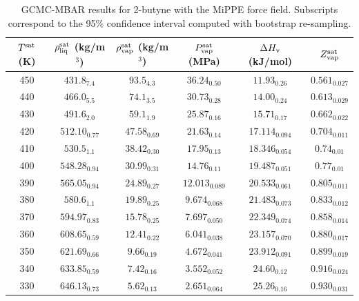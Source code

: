 \documentclass[journal=jctc,manuscript=article]{achemso}
\begin{document}
\begin{table}[htb!]
	\caption{GCMC-MBAR results for 2-butyne with the MiPPE force field. Subscripts correspond to the 95\% confidence interval computed with bootstrap re-sampling.}
	\begin{center}
		\begin{tabular}{|c|c|c|c|c|c|}
			\hline
			$T^{\rm sat}$ (K) & $\rho_{\rm liq}^{\rm sat}$ (kg/m$^3$) & $\rho_{\rm vap}^{\rm sat}$ (kg/m$^3$) & $P_{\rm vap}^{\rm sat}$ (MPa) & $\Delta H_{\rm v}$ (kJ/mol) & $Z_{\rm vap}^{\rm sat}$ \\ \hline
			450 & $431.8_{7.4}$ & $93.5_{4.3}$ & $36.24_{0.50}$ & $11.93_{0.26}$ & $0.561_{0.027}$ \\
			440 & $466.0_{5.5}$ & $74.1_{3.5}$ & $30.73_{0.28}$ & $14.00_{0.24}$ & $0.613_{0.029}$ \\
			430 & $491.6_{2.0}$ & $59.1_{1.9}$ & $25.87_{0.16}$ & $15.71_{0.17}$ & $0.662_{0.022}$ \\
			420 & $512.10_{0.77}$ & $47.58_{0.69}$ & $21.63_{0.14}$ & $17.114_{0.094}$ & $0.704_{0.011}$ \\
			410 & $530.5_{1.1}$ & $38.42_{0.30}$ & $17.95_{0.13}$ & $18.346_{0.054}$ & $0.74_{0.01}$ \\
			400 & $548.28_{0.94}$ & $30.99_{0.31}$ & $14.76_{0.11}$ & $19.487_{0.051}$ & $0.77_{0.01}$ \\
			390 & $565.05_{0.94}$ & $24.89_{0.27}$ & $12.013_{0.089}$ & $20.533_{0.061}$ & $0.805_{0.011}$ \\
			380 & $580.6_{1.1}$ & $19.89_{0.25}$ & $9.674_{0.068}$ & $21.483_{0.073}$ & $0.833_{0.012}$ \\
			370 & $594.97_{0.83}$ & $15.78_{0.25}$ & $7.697_{0.050}$ & $22.349_{0.074}$ & $0.858_{0.014}$ \\
			360 & $608.65_{0.59}$ & $12.41_{0.22}$ & $6.041_{0.038}$ & $23.157_{0.070}$ & $0.880_{0.017}$ \\
			350 & $621.69_{0.66}$ & $9.66_{0.19}$ & $4.672_{0.041}$ & $23.912_{0.091}$ & $0.899_{0.019}$ \\
			340 & $633.85_{0.59}$ & $7.42_{0.16}$ & $3.552_{0.052}$ & $24.60_{0.12}$ & $0.916_{0.024}$ \\
			330 & $646.13_{0.73}$ & $5.62_{0.13}$ & $2.651_{0.064}$ & $25.26_{0.16}$ & $0.930_{0.031}$ \\
			\hline
		\end{tabular}
	\end{center}
\end{table}
\end{document}
